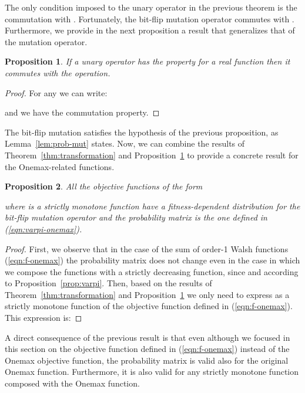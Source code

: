 \documentclass{article}
\newtheorem{proposition}{Proposition}
\begin{document}
The only condition imposed to the unary operator in the previous theorem is the commutation with . Fortunately, the bit-flip mutation operator commutes with . Furthermore, we provide in the next proposition a result that generalizes that of the mutation operator.

\begin{proposition}
\label{prop:commutation}
If a unary operator  has the property  for a real function  then it commutes with the  operation.
\end{proposition}
\begin{proof}
For any  we can write:

and we have the commutation property.
\end{proof}

The bit-flip  mutation satisfies the hypothesis of the previous proposition, as Lemma~\ref{lem:prob-mut} states.
Now, we can combine the results of Theorem~\ref{thm:transformation} and Proposition~\ref{prop:commutation} to provide a concrete result for the Onemax-related functions.

\begin{proposition}
\label{prop:onemax-family}
All the objective functions of the form

where  is a strictly monotone function have a fitness-dependent distribution for the bit-flip mutation operator and the probability matrix is the one defined in (\ref{eqn:varpi-onemax}).
\end{proposition}
\begin{proof}
First, we observe that in the case of the sum of order-1 Walsh functions (\ref{eqn:f-onemax}) the probability matrix  does not change even in the case in which we compose the functions with a strictly decreasing function, since  and  according to Proposition~\ref{prop:varpi}. Then, based on the results of Theorem~\ref{thm:transformation} and Proposition~\ref{prop:commutation} we only need to express  as a strictly monotone function of the objective function  defined in (\ref{eqn:f-onemax}). This expression is:

\end{proof}

A direct consequence of the previous result is that even although we focused in this section on the objective function defined in (\ref{eqn:f-onemax}) instead of the Onemax objective function, the probability matrix  is valid also for the original Onemax function. Furthermore, it is also valid for any strictly monotone function composed with the Onemax function.
\end{document}
